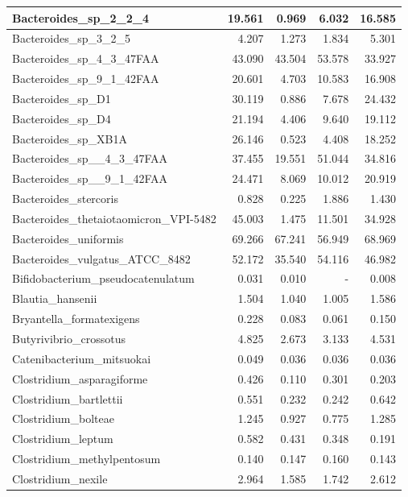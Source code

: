 \documentclass[12pt,a4paper]{article}
\begin{document}
\begin{table}[ht]
\begin{center}
\begin{tabular}{|l*{4}{|r}|}
Bacteroides\_sp\_2\_2\_4 & 19.561 & 0.969 & 6.032 & 16.585 \\ \hline
Bacteroides\_sp\_3\_2\_5 & 4.207 & 1.273 & 1.834 & 5.301 \\ \hline
Bacteroides\_sp\_4\_3\_47FAA & 43.090 & 43.504 & 53.578 & 33.927 \\ \hline
Bacteroides\_sp\_9\_1\_42FAA & 20.601 & 4.703 & 10.583 & 16.908 \\ \hline
Bacteroides\_sp\_D1 & 30.119 & 0.886 & 7.678 & 24.432 \\ \hline
Bacteroides\_sp\_D4 & 21.194 & 4.406 & 9.640 & 19.112 \\ \hline
Bacteroides\_sp\_XB1A & 26.146 & 0.523 & 4.408 & 18.252 \\ \hline
Bacteroides\_sp\_\_4\_3\_47FAA & 37.455 & 19.551 & 51.044 & 34.816 \\ \hline
Bacteroides\_sp\_\_9\_1\_42FAA & 24.471 & 8.069 & 10.012 & 20.919 \\ \hline
Bacteroides\_stercoris & 0.828 & 0.225 & 1.886 & 1.430 \\ \hline
Bacteroides\_thetaiotaomicron\_VPI-5482 & 45.003 & 1.475 & 11.501 & 34.928 \\ \hline
Bacteroides\_uniformis & 69.266 & 67.241 & 56.949 & 68.969 \\ \hline
Bacteroides\_vulgatus\_ATCC\_8482 & 52.172 & 35.540 & 54.116 & 46.982 \\ \hline
Bifidobacterium\_pseudocatenulatum & 0.031 & 0.010 & - & 0.008 \\ \hline
Blautia\_hansenii & 1.504 & 1.040 & 1.005 & 1.586 \\ \hline
Bryantella\_formatexigens & 0.228 & 0.083 & 0.061 & 0.150 \\ \hline
Butyrivibrio\_crossotus & 4.825 & 2.673 & 3.133 & 4.531 \\ \hline
Catenibacterium\_mitsuokai & 0.049 & 0.036 & 0.036 & 0.036 \\ \hline
Clostridium\_asparagiforme & 0.426 & 0.110 & 0.301 & 0.203 \\ \hline
Clostridium\_bartlettii & 0.551 & 0.232 & 0.242 & 0.642 \\ \hline
Clostridium\_bolteae & 1.245 & 0.927 & 0.775 & 1.285 \\ \hline
Clostridium\_leptum & 0.582 & 0.431 & 0.348 & 0.191 \\ \hline
Clostridium\_methylpentosum & 0.140 & 0.147 & 0.160 & 0.143 \\ \hline
Clostridium\_nexile & 2.964 & 1.585 & 1.742 & 2.612 \\ \hline

\end{tabular}
\end{center}
\end{table}
\end{document}
